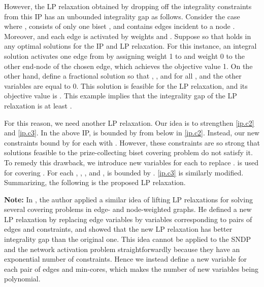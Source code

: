 \documentclass[11pt]{article}
\begin{document}
However, the LP relaxation obtained by dropping off the integrality constraints
from this IP has an unbounded integrality gap as follows. Consider the case where 
, 
consists of only one biset , and 
 contains
 edges incident to a node .
Moreover,  and each
edge  is activated by weights  and .
Suppose  so that  holds in any optimal
solutions for the IP and LP relaxation. 
For this instance, an integral solution activates one edge from
 by assigning weight 1 to  and weight 0 to the
other end-node of the
chosen edge, which achieves the objective value 1.
On the other hand, define a fractional
solution  so that
, ,
and 
for all ,
and the other variables are equal to 0.
This solution
is feasible for the LP relaxation,
and its objective value is . This example implies that
the integrality gap of the LP relaxation is at least .

For this reason, we need another LP relaxation.
Our idea is to strengthen \eqref{ip.c2} and \eqref{ip.c3}.
In the above IP, 
 is bounded by  from below in \eqref{ip.c2}.
Instead, our new constraints bound 
by  for each  with
.
However, these constraints are so strong that solutions feasible
to the prize-collecting biset covering problem do not satisfy it.
To remedy this drawback, we introduce new variables 
for each  to replace .
  is used for covering .
For each , , , and ,
 is bounded by .
\eqref{ip.c3} is similarly modified.
Summarizing, the following is the proposed LP relaxation.


{\bf Note:}
In \cite{Fukunaga14}, the author applied a similar idea of lifting LP relaxations for solving several covering problems
in edge- and node-weighted graphs. He defined a new LP relaxation by 
replacing edge variables by variables corresponding to pairs of edges
and constraints, and showed that the new LP relaxation has better integrality gap than the original one. 
This idea cannot be applied to the SNDP and the network activation problem straightforwardly because
they have an exponential number of constraints. Hence we instead define a new variable for each pair of edges and
min-cores, which makes the number of new variables being polynomial.
\end{document}
